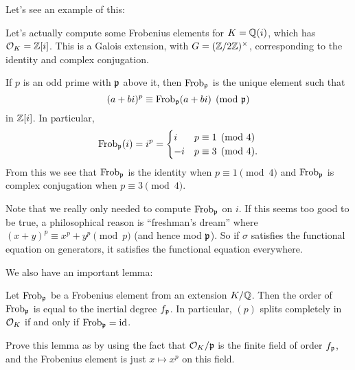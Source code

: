 Let's see an example of this:
\begin{example}
	Let's actually compute some Frobenius elements for $K = \mathbb Q(i)$,
	which has $\mathcal O_K = \mathbb Z[i]$.
	This is a Galois extension, with $G = (\mathbb Z/2\mathbb Z)^\times$,
	corresponding to the identity and complex conjugation.

	If $p$ is an odd prime with $\mathfrak p$ above it,
	then $\mathrm{Frob}_\mathfrak p$ is the unique element such that
	\[ (a+bi)^p \equiv \mathrm{Frob}_\mathfrak p(a+bi) \pmod{\mathfrak p} \]
	in $\mathbb Z[i]$. In particular,
	\[ \mathrm{Frob}_\mathfrak p(i) = i^p =
		\begin{cases}
			i & p \equiv 1 \pmod 4 \\
			-i & p \equiv 3 \pmod 4.
		\end{cases}
	\]
	From this we see that $\mathrm{Frob}_\mathfrak p$ is the identity when $p \equiv 1 \pmod 4$
	and $\mathrm{Frob}_\mathfrak p$ is complex conjugation when $p \equiv 3 \pmod 4$.
\end{example}
Note that we really only needed to compute $\mathrm{Frob}_\mathfrak p$ on $i$.
If this seems too good to be true,
a philosophical reason is ``freshman's dream''
where $(x+y)^p \equiv x^p + y^p \pmod{p}$ (and hence mod $\mathfrak p$).
So if $\sigma$ satisfies the functional equation on generators,
it satisfies the functional equation everywhere.

We also have an important lemma:
\begin{lemma}
	Let $\mathrm{Frob}_\mathfrak p$ be a Frobenius element from an extension $K/\mathbb Q$.
	Then the order of $\mathrm{Frob}_\mathfrak p$ is equal to the inertial degree $f_\mathfrak p$.
	In particular, $(p)$ splits completely in $\mathcal O_K$
	if and only if $\mathrm{Frob}_\mathfrak p = \mathrm{id}$.
\end{lemma}
\begin{exercise}
	Prove this lemma as by using the fact that $\mathcal O_K / \mathfrak p$
	is the finite field of order $f_\mathfrak p$,
	and the Frobenius element is just $x \mapsto x^p$ on this field.
\end{exercise}

